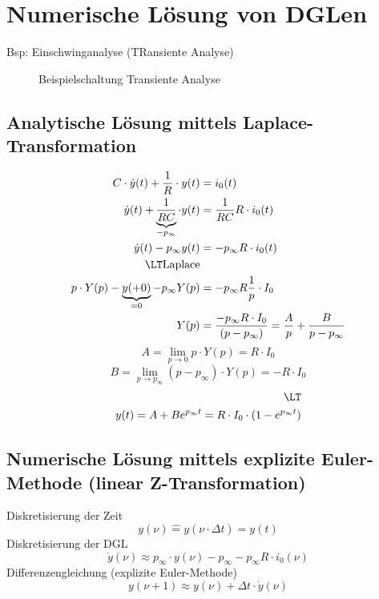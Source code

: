 \section{Numerische Lösung von DGLen}
Bsp: Einschwinganalyse (TRansiente Analyse)

\begin{figure}
\center

\caption{Beispielschaltung Transiente Analyse}
\end{figure}

\subsection{Analytische Lösung mittels Laplace-Transformation}
\begin{equation}
\begin{split}
C\cdot\dot{y}(t) + \frac{1}{R}\cdot y(t) &= i_0(t)\\
\dot{y}(t) + \underbrace{\frac{1}{RC}}_{-p_\infty}\cdot y(t) &= \frac{1}{RC}R\cdot i_0(t)\\
\dot{y}(t) - p_\infty y(t) &= -p_\infty R\cdot i_0(t)\\
\LT \text{Laplace}\\
p\cdot Y(p) - \underbrace{y(+0)}_{=0} - p_\infty Y(p) &= -p_\infty R\frac{1}{p}\cdot I_0\\
Y(p) &= \frac{-p_\infty R\cdot I_0}{(p-p_\infty)} = \frac{A}{p} + \frac{B}{p-p_\infty}
\end{split}
\end{equation}
\begin{equation}
A = \lim\limits_{p\rightarrow 0} p\cdot Y(p) = R\cdot I_0
\end{equation}
\begin{equation}
B = \lim\limits_{p\rightarrow p_\infty} (p-p_\infty)\cdot Y(p) = -R\cdot I_0
\end{equation}
\begin{equation}
\begin{split}
\LT\\
y(t) = A + B e^{p_\infty t} = R\cdot I_0\cdot (1-e^{p_\infty t})
\end{split}
\end{equation}

\subsection{Numerische Lösung mittels explizite Euler-Methode (linear Z-Transformation)}
Diskretisierung der Zeit
\begin{equation}
y(\nu)\hat{=} y(\nu\cdot\Delta t) = y(t)
\end{equation}
Diskretisierung der DGL
\begin{equation}
\dot{y}(\nu)\approx p_\infty\cdot y(\nu) - p_\infty - p_\infty R\cdot i_0(\nu)
\end{equation}
Differenzengleichung (explizite Euler-Methode)
\begin{equation}
y(\nu+1)\approx y(\nu) + \Delta t\cdot\dot{y}(\nu)
\end{equation}

